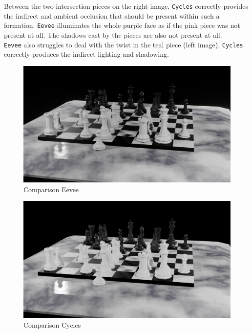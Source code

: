\documentclass[11pt]{article}
\begin{document}
Between the two intersection pieces on the right image, \texttt{Cycles} correctly
provides the indirect and ambient occlusion that should be present within such a
formation. \texttt{Eevee} illuminates the whole purple face as if the pink piece was
not present at all. The shadows cast by the pieces are also not present at
all.\\

\texttt{Eevee} also struggles to deal with the twist in the teal piece (left
image), \texttt{Cycles} correctly produces the indirect lighting and shadowing.
\begin{figure}[htbp]
\centering
\includegraphics[width=\textwidth]{Images/reflections-eevee.png}
\caption{\label{reflections-eevee}Comparison Eevee}
\end{figure}

\begin{figure}[htbp]
\centering
\includegraphics[width=\textwidth]{Images/reflections-cycles.png}
\caption{\label{reflections-cycles}Comparison Cycles}
\end{figure}
\end{document}
